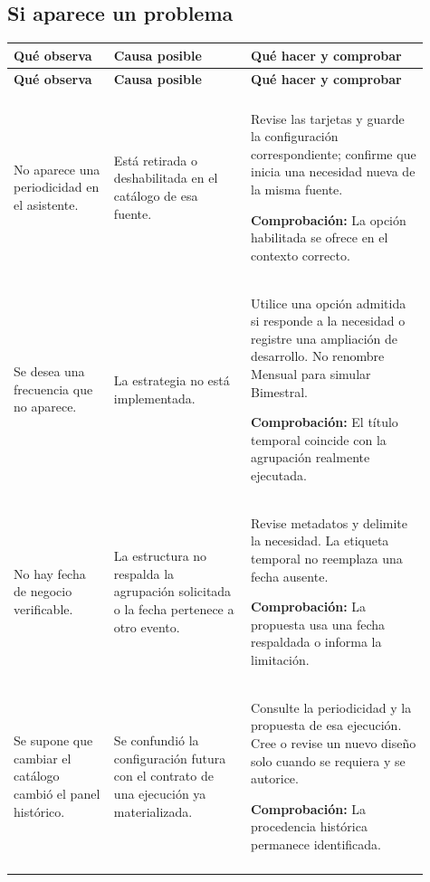 \subsection{Si aparece un problema}
\begingroup
\fontsize{10}{12.5}\selectfont
\setlength{\tabcolsep}{5pt}
\renewcommand{\arraystretch}{1.15}
\begin{longtable}{@{}>{\RaggedRight\arraybackslash}p{0.22\linewidth}>{\RaggedRight\arraybackslash}p{0.3\linewidth}>{\RaggedRight\arraybackslash}p{0.39\linewidth}@{}}
\toprule
\textbf{Qué observa} & \textbf{Causa posible} & \textbf{Qué hacer y comprobar} \\
\midrule
\endfirsthead
\toprule
\textbf{Qué observa} & \textbf{Causa posible} & \textbf{Qué hacer y comprobar} \\
\midrule
\endhead
\midrule
\multicolumn{3}{r}{\footnotesize Continúa en la página siguiente}\\
\endfoot
\bottomrule
\endlastfoot
No aparece una periodicidad en el asistente. & Está retirada o deshabilitada en el catálogo de esa fuente. & Revise las tarjetas y guarde la configuración correspondiente; confirme que inicia una necesidad nueva de la misma fuente.\par\smallskip\textbf{Comprobación:} La opción habilitada se ofrece en el contexto correcto. \\
\addlinespace[3pt]
Se desea una frecuencia que no aparece. & La estrategia no está implementada. & Utilice una opción admitida si responde a la necesidad o registre una ampliación de desarrollo. No renombre Mensual para simular Bimestral.\par\smallskip\textbf{Comprobación:} El título temporal coincide con la agrupación realmente ejecutada. \\
\addlinespace[3pt]
No hay fecha de negocio verificable. & La estructura no respalda la agrupación solicitada o la fecha pertenece a otro evento. & Revise metadatos y delimite la necesidad. La etiqueta temporal no reemplaza una fecha ausente.\par\smallskip\textbf{Comprobación:} La propuesta usa una fecha respaldada o informa la limitación. \\
\addlinespace[3pt]
Se supone que cambiar el catálogo cambió el panel histórico. & Se confundió la configuración futura con el contrato de una ejecución ya materializada. & Consulte la periodicidad y la propuesta de esa ejecución. Cree o revise un nuevo diseño solo cuando se requiera y se autorice.\par\smallskip\textbf{Comprobación:} La procedencia histórica permanece identificada. \\
\addlinespace[3pt]
\end{longtable}
\endgroup

